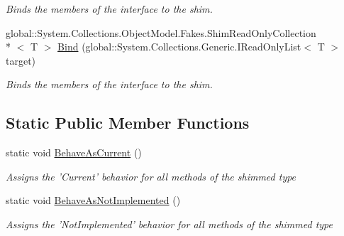 \begin{DoxyCompactItemize}
\begin{DoxyCompactList}\small\item\em Binds the members of the interface to the shim.\end{DoxyCompactList}\item 
global\-::\-System.\-Collections.\-Object\-Model.\-Fakes.\-Shim\-Read\-Only\-Collection\\*
$<$ T $>$ \hyperlink{class_system_1_1_collections_1_1_object_model_1_1_fakes_1_1_shim_read_only_collection_3_01_t_01_4_ab7e3b4a482ff27bd41dd15262e810f0d}{Bind} (global\-::\-System.\-Collections.\-Generic.\-I\-Read\-Only\-List$<$ T $>$ target)
\begin{DoxyCompactList}\small\item\em Binds the members of the interface to the shim.\end{DoxyCompactList}\end{DoxyCompactItemize}
\subsection*{Static Public Member Functions}
\begin{DoxyCompactItemize}
\item 
static void \hyperlink{class_system_1_1_collections_1_1_object_model_1_1_fakes_1_1_shim_read_only_collection_3_01_t_01_4_a1972346828982948cd9853bc298fef59}{Behave\-As\-Current} ()
\begin{DoxyCompactList}\small\item\em Assigns the 'Current' behavior for all methods of the shimmed type\end{DoxyCompactList}\item 
static void \hyperlink{class_system_1_1_collections_1_1_object_model_1_1_fakes_1_1_shim_read_only_collection_3_01_t_01_4_a7ee0063bb309628c2f9821cbcc7e3e99}{Behave\-As\-Not\-Implemented} ()
\begin{DoxyCompactList}\small\item\em Assigns the 'Not\-Implemented' behavior for all methods of the shimmed type\end{DoxyCompactList}\end{DoxyCompactItemize}
